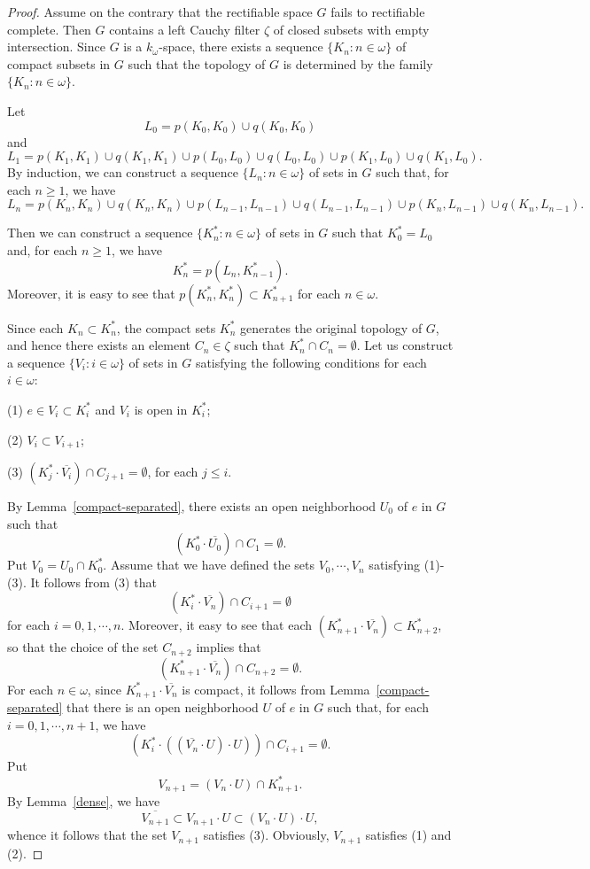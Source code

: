 \documentclass[psamsfonts,fceqn,leqno]{amsart}
\theoremstyle{definition}
\begin{document}
\begin{proof}
Assume on the contrary that the rectifiable space $G$ fails to rectifiable complete. Then $G$ contains a left Cauchy filter $\zeta$ of closed subsets with empty intersection. Since $G$ is a $k_{\omega}$-space, there exists a sequence $\{K_{n}: n\in\omega\}$ of compact subsets in $G$ such that the topology of $G$ is determined by the family $\{K_{n}: n\in\omega\}$.
\smallskip

Let $$L_{0}=p(K_{0}, K_{0})\cup q(K_{0}, K_{0})$$ and $$L_{1}=p(K_{1}, K_{1})\cup q(K_{1}, K_{1})\cup p(L_{0}, L_{0})\cup q(L_{0}, L_{0})\cup p(K_{1}, L_{0})\cup q(K_{1}, L_{0}).$$ By induction, we can construct a sequence $\{L_{n}: n\in\omega\}$ of sets in $G$ such that, for each $n\geq 1$, we have $$L_{n}=p(K_{n}, K_{n})\cup q(K_{n}, K_{n})\cup p(L_{n-1}, L_{n-1})\cup q(L_{n-1}, L_{n-1})\cup p(K_{n}, L_{n-1})\cup q(K_{n}, L_{n-1}).$$

Then we can construct a sequence $\{K_{n}^{\ast}: n\in\omega\}$ of sets in $G$ such that $K_{0}^{\ast}=L_{0}$ and, for each $n\geq 1$, we have
\smallskip
$$K_{n}^{\ast}=p(L_{n}, K_{n-1}^{\ast}).$$Moreover, it is easy to see that $p(K_{n}^{\ast}, K_{n}^{\ast})\subset K_{n+1}^{\ast}$ for each $n\in\omega$.
\smallskip

Since each $K_{n}\subset K_{n}^{\ast}$, the compact sets $K_{n}^{\ast}$ generates the original topology of $G$, and hence there exists an element $C_{n}\in\zeta$ such that $K_{n}^{\ast}\cap C_{n}=\emptyset$. Let us construct a sequence $\{V_{i}: i\in\omega\}$ of sets in $G$ satisfying the following conditions for each $i\in\omega$:
\smallskip

(1) $e\in V_{i}\subset K_{i}^{\ast}$ and $V_{i}$ is open in $K_{i}^{\ast}$;
\smallskip

(2) $V_{i}\subset V_{i+1}$;
\smallskip

(3) $(K_{j}^{\ast}\cdot \overline{V_{i}})\cap C_{j+1}=\emptyset$, for each $j\leq i.$
\smallskip

By Lemma~\ref{compact-separated}, there exists an open neighborhood $U_{0}$ of $e$ in $G$ such that $$(K_{0}^{\ast}\cdot \overline{U_{0}})\cap C_{1}=\emptyset.$$ Put $V_{0}=U_{0}\cap K_{0}^{\ast}$. Assume that we have defined the sets $V_{0}, \cdots, V_{n}$ satisfying (1)-(3). It follows from (3) that $$(K_{i}^{\ast}\cdot \overline{V_{n}})\cap C_{i+1}=\emptyset$$ for each $i=0, 1, \cdots, n.$ Moreover, it easy to see that each $(K_{n+1}^{\ast}\cdot \overline{V_{n}})\subset K_{n+2}^{\ast}$, so that the choice of the set $C_{n+2}$ implies that $$(K_{n+1}^{\ast}\cdot \overline{V_{n}})\cap C_{n+2}=\emptyset.$$ For each $n\in\omega$, since $K_{n+1}^{\ast}\cdot \overline{V_{n}}$ is compact, it follows from Lemma~\ref{compact-separated} that there is an open neighborhood $U$ of $e$ in $G$ such that, for each $i=0, 1, \cdots, n+1$, we have$$(K_{i}^{\ast}\cdot ((\overline{V_{n}}\cdot U)\cdot U))\cap C_{i+1}=\emptyset.$$Put $$V_{n+1}=(V_{n}\cdot U)\cap K_{n+1}^{\ast}.$$ By Lemma~\ref{dense}, we have $$\overline{V_{n+1}}\subset V_{n+1}\cdot U \subset (V_{n}\cdot U)\cdot U,$$ whence it follows that the set $V_{n+1}$ satisfies (3). Obviously, $V_{n+1}$ satisfies (1) and (2).
\smallskip


\end{proof}
\end{document}
